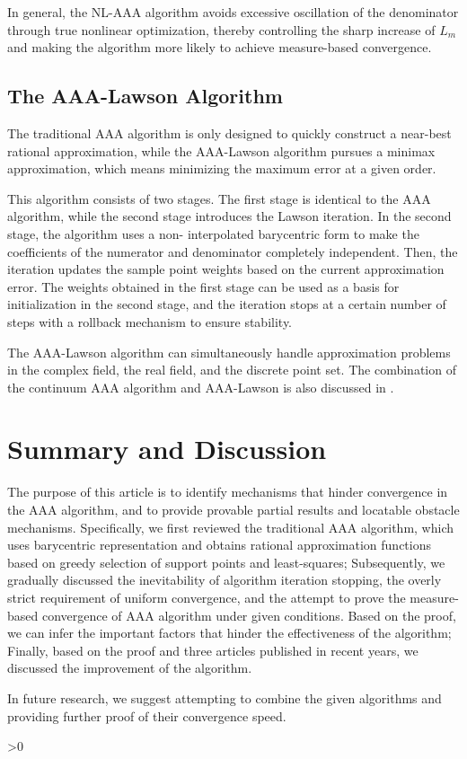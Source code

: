 \documentclass[12pt,a4paper]{article}  %
\newcommand{\bibfile}{\jobname.bib}  %
\newcounter{cite}
\theoremstyle{definition}
\numberwithin{equation}{section}
\begin{document}
In general, the NL-AAA algorithm avoids excessive oscillation of the denominator through true nonlinear optimization, thereby controlling the sharp increase of $L_m$ and making the algorithm more likely to achieve measure-based convergence.

\subsection{The AAA-Lawson Algorithm}
The traditional AAA algorithm is only designed to quickly construct a  near-best rational approximation, while the AAA-Lawson algorithm pursues a minimax approximation, which means minimizing the maximum error at a given order.

This algorithm consists of two stages. The first stage is identical to the AAA algorithm, while the second stage introduces the Lawson iteration. In the second stage, the algorithm uses a non- interpolated barycentric form to make the coefficients of the numerator and denominator completely independent. Then, the iteration updates the sample point weights based on the current approximation error. The weights obtained in the first stage can be used as a basis for initialization in the second stage, and the iteration stops at a certain number of steps with a rollback mechanism to ensure stability.

The AAA-Lawson algorithm can simultaneously handle approximation problems in the complex field, the real field, and the discrete point set. The combination of the continuum AAA algorithm and AAA-Lawson is also discussed in \cite{driscoll2023aaarationalapproximationcontinuum}.

\section{Summary and Discussion}
The purpose of this article is to identify mechanisms that hinder convergence in the AAA algorithm, and to provide provable partial results and locatable obstacle mechanisms. Specifically, we first reviewed the traditional AAA algorithm, which uses barycentric representation and obtains rational approximation functions based on greedy selection of support points and least-squares; Subsequently, we gradually discussed the inevitability of algorithm iteration stopping, the overly strict requirement of uniform convergence, and the attempt to prove the measure-based convergence of AAA algorithm under given conditions. Based on the proof, we can infer the important factors that hinder the effectiveness of the algorithm; Finally, based on the proof and three articles published in recent years, we discussed the improvement of the algorithm.

In future research, we suggest attempting to combine the given algorithms and providing further proof of their convergence speed.




\ifnum\value{cite}>0
    \small
    
    
\fi

\end{document}
